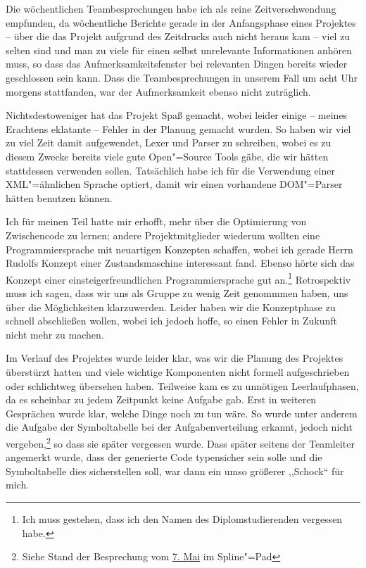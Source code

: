 \documentclass[10pt,a4paper,ngerman,titlepage,tocindentauto]{scrartcl}
\begin{document}
		Die wöchentlichen Teambesprechungen habe ich als reine Zeitverschwendung empfunden, da wöchentliche
		Berichte gerade in der Anfangsphase eines Projektes -- über die das Projekt aufgrund des Zeitdrucks
		auch nicht heraus kam -- viel zu selten sind und man zu viele für einen selbst unrelevante Informationen
		anhören muss, so dass das Aufmerksamkeitsfenster bei relevanten Dingen bereits wieder geschlossen
		sein kann. Dass die Teambesprechungen in unserem Fall um acht Uhr morgens stattfanden, war der Aufmerksamkeit
		ebenso nicht zuträglich.
		
		Nichtsdestoweniger hat das Projekt Spaß gemacht, wobei leider einige -- meines Erachtens eklatante -- Fehler in
		der Planung gemacht wurden. So haben wir viel zu viel Zeit damit aufgewendet, Lexer und Parser zu schreiben, wobei
		es zu diesem Zwecke bereits viele gute Open"=Source Tools gäbe, die wir hätten stattdessen verwenden sollen.
		Tatsächlich habe ich für die Verwendung einer XML"=ähnlichen Sprache optiert, damit wir einen vorhandene
		DOM"=Parser hätten benutzen können.
		
		Ich für meinen Teil hatte mir erhofft, mehr über die Optimierung von Zwischencode zu lernen; andere Projektmitglieder
		wiederum wollten eine Programmiersprache mit neuartigen Konzepten schaffen, wobei ich gerade Herrn Rudolfs Konzept einer
		Zustandsmaschine interessant fand. Ebenso hörte sich das Konzept einer einsteigerfreundlichen Programmiersprache gut an.\footnote
		{Ich muss gestehen, dass ich den Namen des Diplomstudierenden vergessen habe.}
		Retrospektiv muss ich sagen, dass wir uns als Gruppe zu wenig Zeit genommmen haben, uns über die Möglichkeiten
		klarzuwerden. Leider haben wir die Konzeptphase zu schnell abschließen wollen, wobei ich jedoch hoffe, so einen
		Fehler in Zukunft nicht mehr zu machen.
		
		Im Verlauf des Projektes wurde leider klar, was wir die Planung des Projektes überstürzt hatten und viele wichtige
		Komponenten nicht formell aufgeschrieben oder schlichtweg übersehen haben. Teilweise kam es zu unnötigen Leerlaufphasen,
		da es scheinbar zu jedem Zeitpunkt keine Aufgabe gab. Erst in weiteren Gesprächen wurde klar, welche Dinge noch zu tun
		wäre. So wurde unter anderem die Aufgabe der Symboltabelle bei der Aufgabenverteilung erkannt, jedoch nicht vergeben,\footnote
		{Siehe Stand der Besprechung vom \href{http://pad.spline.de/ep/pad/view/ro.v9mc/rev.7990}{7. Mai} im Spline"=Pad}
		so dass sie später vergessen wurde. Dass später seitens der Teamleiter angemerkt wurde, dass der generierte Code
		typensicher sein solle und die Symboltabelle dies sicherstellen soll, war dann ein umso größerer ,,Schock`` für mich.
		
\end{document}

